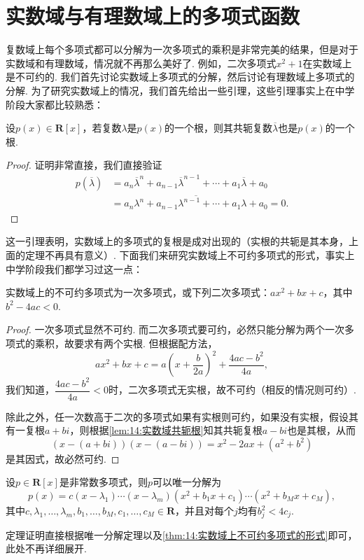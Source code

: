 \section{实数域与有理数域上的多项式函数}
复数域上每个多项式都可以分解为一次多项式的乘积是非常完美的结果，但是对于实数域和有理数域，情况就不再那么美好了. 例如，二次多项式$x^2+1$在实数域上是不可约的. 我们首先讨论实数域上多项式的分解，然后讨论有理数域上多项式的分解. 为了研究实数域上的情况，我们首先给出一些引理，这些引理事实上在中学阶段大家都比较熟悉：
\begin{lemma} \label{lem:14:实数域共轭根}
    设$p(x)\in\mathbf{R}[x]$，若复数$\lambda$是$p(x)$的一个根，则其共轭复数$\overline{\lambda}$也是$p(x)$的一个根.
\end{lemma}
\begin{proof}
    证明非常直接，我们直接验证
    \begin{align*}
        p(\overline{\lambda})&=a_n\overline{\lambda}^n+a_{n-1}\overline{\lambda}^{n-1}+\cdots+a_1\overline{\lambda}+a_0\\
        &=\overline{a_n\lambda^n+a_{n-1}\lambda^{n-1}+\cdots+a_1\lambda+a_0}=0.
    \end{align*}
\end{proof}
这一引理表明，实数域上的多项式的复根是成对出现的（实根的共轭是其本身，上面的定理不再具有意义）. 下面我们来研究实数域上不可约多项式的形式，事实上中学阶段我们都学习过这一点：
\begin{lemma} \label{thm:14:实数域上不可约多项式的形式}
    实数域上的不可约多项式为一次多项式，或下列二次多项式：$ax^2+bx+c$，其中$b^2-4ac<0$.
\end{lemma}
\begin{proof}
    一次多项式显然不可约. 而二次多项式要可约，必然只能分解为两个一次多项式的乘积，故要求有两个实根. 但根据配方法，
    \[ax^2+bx+c=a\left(x+\dfrac{b}{2a}\right)^2+\dfrac{4ac-b^2}{4a},\]
    我们知道，$\dfrac{4ac-b^2}{4a}<0$时，二次多项式无实根，故不可约（相反的情况则可约）.

    除此之外，任一次数高于二次的多项式如果有实根则可约，如果没有实根，假设其有一复根$a+bi$，则根据\autoref{lem:14:实数域共轭根}知其共轭复根$a-bi$也是其根，从而
    \[(x-(a+bi))(x-(a-bi))=x^2-2ax+(a^2+b^2)\]
    是其因式，故必然可约.
\end{proof}

\begin{theorem} \label{thm:14:实数域上多项式分解}
    设$p\in\mathbf{R}[x]$是非常数多项式，则$p$可以唯一分解为
    \[p(x)=c(x-\lambda_1)\cdots(x-\lambda_m)(x^2+b_1x+c_1)\cdots(x^2+b_Mx+c_M),\]
    其中$c,\lambda_1,\ldots,\lambda_m,b_1,\ldots,b_M,c_1,\ldots,c_M\in\mathbf{R}$，并且对每个$j$均有$b_j^2<4c_j$.
\end{theorem}
定理证明直接根据唯一分解定理以及\autoref{thm:14:实数域上不可约多项式的形式}即可，此处不再详细展开.

